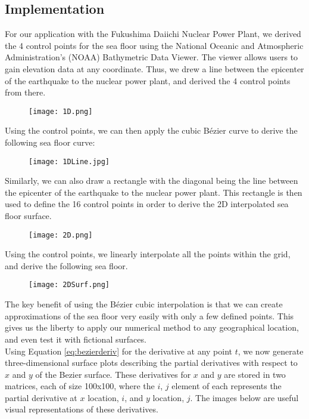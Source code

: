 \documentclass[../main.tex]{subfiles}
\begin{document}
\subsection{Implementation}
For our application with the Fukushima Daiichi Nuclear Power Plant, we derived the 4 control points for the sea floor using the National Oceanic and Atmospheric Administration's (NOAA) Bathymetric Data Viewer.  The viewer allows users to gain elevation data at any coordinate.  Thus, we drew a line between the epicenter of the earthquake to the nuclear power plant, and derived the 4 control points from there.
\begin{figure}[H]
\centering
\texttt{[image: 1D.png]}
\end{figure}
\noindent Using the control points, we can then apply the cubic B\'ezier curve to derive the following sea floor curve:
\begin{figure}[H]
\centering
\texttt{[image: 1DLine.jpg]}
\end{figure}
\noindent Similarly, we can also draw a rectangle with the diagonal being the line between the epicenter of the earthquake to the nuclear power plant.  This rectangle is then used to define the 16 control points in order to derive the 2D interpolated sea floor surface.
\begin{figure}[H]
\centering
\texttt{[image: 2D.png]}
\end{figure}
\noindent Using the control points, we linearly interpolate all the points within the grid, and derive the following sea floor.
\begin{figure}[H]
\centering
\texttt{[image: 2DSurf.png]}
\end{figure}

\noindent The key benefit of using the B\'ezier cubic interpolation is that we can create approximations of the sea floor very easily with only a few defined points.  This gives us the liberty to apply our numerical method to any geographical location, and even test it with fictional surfaces. \\


\noindent Using Equation \ref{eq:bezierderiv} for the derivative at any point $t$, we now generate three-dimensional surface plots describing the partial derivatives with respect to $x$ and $y$ of the Bezier surface. These derivatives for $x$ and $y$ are stored in two matrices, each of size 100x100, where the $i$, $j$ element of each represents the partial derivative at $x$ location, $i$, and $y$ location, $j$. The images below are useful visual representations of these derivatives.
\end{document}

